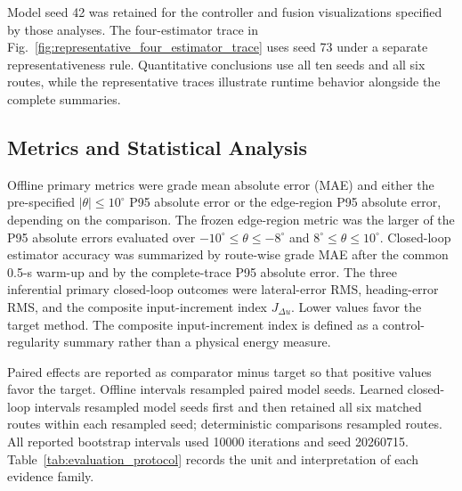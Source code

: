 \documentclass{ieeeaccess}
\begin{document}
Model seed 42 was retained for the controller and fusion visualizations specified by those analyses. The four-estimator trace in Fig.~\ref{fig:representative_four_estimator_trace} uses seed 73 under a separate representativeness rule. Quantitative conclusions use all ten seeds and all six routes, while the representative traces illustrate runtime behavior alongside the complete summaries.

\subsection{Metrics and Statistical Analysis}

Offline primary metrics were grade mean absolute error (MAE) and either the pre-specified $|\theta|\leq10^{\circ}$ P95 absolute error or the edge-region P95 absolute error, depending on the comparison. The frozen edge-region metric was the larger of the P95 absolute errors evaluated over $-10^{\circ}\leq\theta\leq-8^{\circ}$ and $8^{\circ}\leq\theta\leq10^{\circ}$. Closed-loop estimator accuracy was summarized by route-wise grade MAE after the common 0.5-s warm-up and by the complete-trace P95 absolute error. The three inferential primary closed-loop outcomes were lateral-error RMS, heading-error RMS, and the composite input-increment index $J_{\Delta u}$. Lower values favor the target method. The composite input-increment index is defined as a control-regularity summary rather than a physical energy measure.

Paired effects are reported as comparator minus target so that positive values favor the target. Offline intervals resampled paired model seeds. Learned closed-loop intervals resampled model seeds first and then retained all six matched routes within each resampled seed; deterministic comparisons resampled routes. All reported bootstrap intervals used 10000 iterations and seed 20260715. Table~\ref{tab:evaluation_protocol} records the unit and interpretation of each evidence family.
\end{document}
